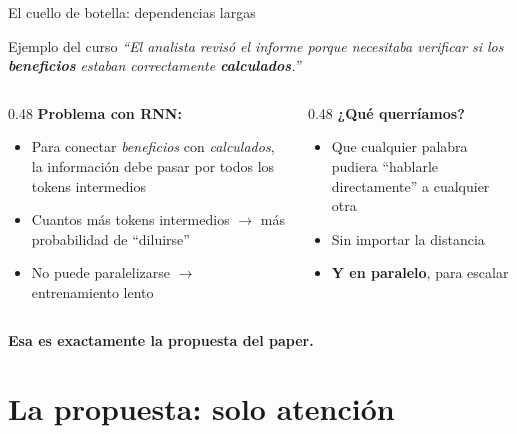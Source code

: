 \documentclass[aspectratio=169, 10pt]{beamer}
\newcommand{\concept}[1]{\textcolor{fenblue}{\textbf{#1}}}
\begin{document}

\begin{frame}{El cuello de botella: dependencias largas}

  \begin{block}{Ejemplo del curso}
    \textit{``El analista revisó el informe porque necesitaba verificar si los \textbf{beneficios} estaban correctamente \textbf{calculados}.''}
  \end{block}

  \vspace{0.5em}
  \begin{columns}[T]
    \begin{column}{0.48\textwidth}
      \textbf{Problema con RNN:}
      \begin{itemize}
        \item Para conectar \textit{beneficios} con \textit{calculados}, la información debe pasar por todos los tokens intermedios
        \item Cuantos más tokens intermedios $\rightarrow$ más probabilidad de ``diluirse''
        \item No puede paralelizarse $\rightarrow$ entrenamiento lento
      \end{itemize}
    \end{column}
    \begin{column}{0.48\textwidth}
      \textbf{¿Qué querríamos?}
      \begin{itemize}
        \item Que cualquier palabra pudiera ``hablarle directamente'' a cualquier otra
        \item Sin importar la distancia
        \item \concept{Y en paralelo}, para escalar
      \end{itemize}
    \end{column}
  \end{columns}

  \vspace{0.6em}
  \begin{center}
    \large \textbf{Esa es exactamente la propuesta del paper.}
  \end{center}

\end{frame}

\section{La propuesta: solo atención}
\end{document}
